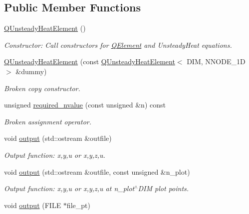 \subsection*{Public Member Functions}
\begin{DoxyCompactItemize}
\item 
\hyperlink{classoomph_1_1QUnsteadyHeatElement_a369f5e16f4937d14d459933e181b6b4f}{Q\+Unsteady\+Heat\+Element} ()
\begin{DoxyCompactList}\small\item\em Constructor\+: Call constructors for \hyperlink{classoomph_1_1QElement}{Q\+Element} and Unsteady\+Heat equations. \end{DoxyCompactList}\item 
\hyperlink{classoomph_1_1QUnsteadyHeatElement_a608ef03a31a169422cc2b717b732434c}{Q\+Unsteady\+Heat\+Element} (const \hyperlink{classoomph_1_1QUnsteadyHeatElement}{Q\+Unsteady\+Heat\+Element}$<$ D\+IM, N\+N\+O\+D\+E\+\_\+1D $>$ \&dummy)
\begin{DoxyCompactList}\small\item\em Broken copy constructor. \end{DoxyCompactList}\item 
unsigned \hyperlink{classoomph_1_1QUnsteadyHeatElement_abd2a8d2835bd9bd57119811d4c765e02}{required\+\_\+nvalue} (const unsigned \&n) const
\begin{DoxyCompactList}\small\item\em Broken assignment operator. \end{DoxyCompactList}\item 
void \hyperlink{classoomph_1_1QUnsteadyHeatElement_a50c15ed85f1200ac8e81192cc4b5584f}{output} (std\+::ostream \&outfile)
\begin{DoxyCompactList}\small\item\em Output function\+: x,y,u or x,y,z,u. \end{DoxyCompactList}\item 
void \hyperlink{classoomph_1_1QUnsteadyHeatElement_ae54ed4ee8b36659f7498a4bef75f35c2}{output} (std\+::ostream \&outfile, const unsigned \&n\+\_\+plot)
\begin{DoxyCompactList}\small\item\em Output function\+: x,y,u or x,y,z,u at n\+\_\+plot$^\wedge$\+D\+IM plot points. \end{DoxyCompactList}\item 
void \hyperlink{classoomph_1_1QUnsteadyHeatElement_a8fc87ff8818027bbbb9aa48b4ab5cd91}{output} (F\+I\+LE $\ast$file\+\_\+pt)

\end{DoxyCompactItemize}
